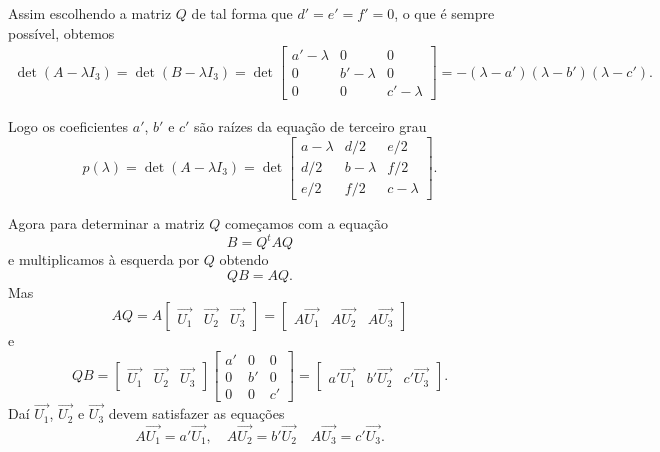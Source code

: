 Assim escolhendo a matriz $Q$ de tal forma que $d' = e' = f' = 0$, o que é sempre possível, obtemos
\begin{align*}
    \det(A - \lambda I_3) = \det(B - \lambda I_3) = \det \begin{bmatrix}
                                                             a' - \lambda & 0            & 0            \\
                                                             0            & b' - \lambda & 0            \\
                                                             0            & 0            & c' - \lambda
                                                         \end{bmatrix} = -(\lambda - a')(\lambda - b')(\lambda - c').
\end{align*}

Logo os coeficientes $a'$, $b'$ e $c'$ são raízes da equação de terceiro grau
\begin{equation}
    p(\lambda) = \det(A - \lambda I_3) = \det \begin{bmatrix}
        a - \lambda & d/2         & e/2         \\
        d/2         & b - \lambda & f/2         \\
        e/2         & f/2         & c - \lambda
    \end{bmatrix}.
\end{equation}

Agora para determinar a matriz $Q$ começamos com a equação
\[
    B = Q^t A Q
\]
e multiplicamos à esquerda por $Q$ obtendo
\[
    Q B = AQ.
\]
Mas
\[
    AQ = A \begin{bmatrix}
        \vec{U_1} & \vec{U_2} & \vec{U_3}
    \end{bmatrix} = \begin{bmatrix}
        A\vec{U_1} & A\vec{U_2} & A\vec{U_3}
    \end{bmatrix}
\]
e
\[
    QB = \begin{bmatrix}
        \vec{U_1} & \vec{U_2} & \vec{U_3}
    \end{bmatrix}\begin{bmatrix}
        a' & 0  & 0  \\
        0  & b' & 0  \\
        0  & 0  & c'
    \end{bmatrix} = \begin{bmatrix}
        a'\vec{U_1} & b'\vec{U_2} & c'\vec{U_3}
    \end{bmatrix}.
\]
Daí $\vec{U_1}$, $\vec{U_2}$ e $\vec{U_3}$ devem satisfazer as equações
\[
    A\vec{U_1} = a'\vec{U_1},\quad A\vec{U_2} = b'\vec{U_2} \quad A\vec{U_3} = c'\vec{U_3}.
\]

